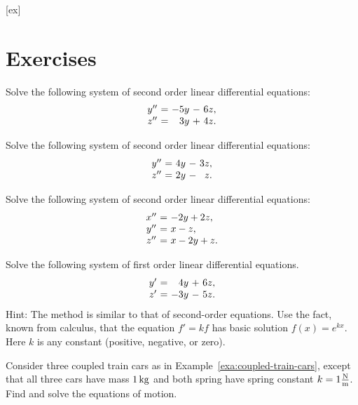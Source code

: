[ex]
\section*{Exercises}

\begin{enumialphparenastyle}

\begin{ex}
  Solve the following system of second order linear differential equations:
  \begin{equation*}
    \begin{array}{c@{~}c@{~}r@{~}r@{~}r}
      y'' &=& -5y &-& 6z, \\
      z'' &=& 3y &+& 4z. \\
    \end{array}
  \end{equation*}
\end{ex}  
  
\begin{ex}
  Solve the following system of second order linear differential equations:
  \begin{equation*}
    \begin{array}{c@{~}c@{~}r@{~}r@{~}r}
      y'' &=& 4y &-& 3z, \\
      z'' &=& 2y &-& z. \\
    \end{array}
  \end{equation*}
\end{ex}  
  
\begin{ex}
  Solve the following system of second order linear differential equations:
  \begin{equation*}
    \begin{array}{c@{~}c@{~}l}
      x'' &=& -2y + 2z, \\
      y'' &=& x - z, \\
      z'' &=& x - 2y + z. \\
    \end{array}
  \end{equation*}
\end{ex}

\begin{ex}
  Solve the following system of first order linear differential equations.
  \begin{equation*}
    \begin{array}{c@{~}c@{~}r@{~}r@{~}r}
      y' &=& 4y &+& 6z, \\
      z' &=& -3y &-& 5z. \\
    \end{array}
  \end{equation*}
  Hint: The method is similar to that of second-order equations. Use
  the fact, known from calculus, that the equation $f'=kf$ has basic
  solution $f(x) = e^{kx}$. Here $k$ is any constant (positive,
  negative, or zero). 
\end{ex}

\begin{ex}
  Consider three coupled train cars as in
  Example~\ref{exa:coupled-train-cars}, except that all three cars
  have mass $1\mathop{\textrm{\rm kg}}\nolimits$ and both spring have spring constant
  $k=1\frac{\mathop{\textrm{\rm N}}\nolimits}{\mathop{\textrm{\rm m}}\nolimits}$. Find and solve the equations of motion.
\end{ex}


\end{enumialphparenastyle}
